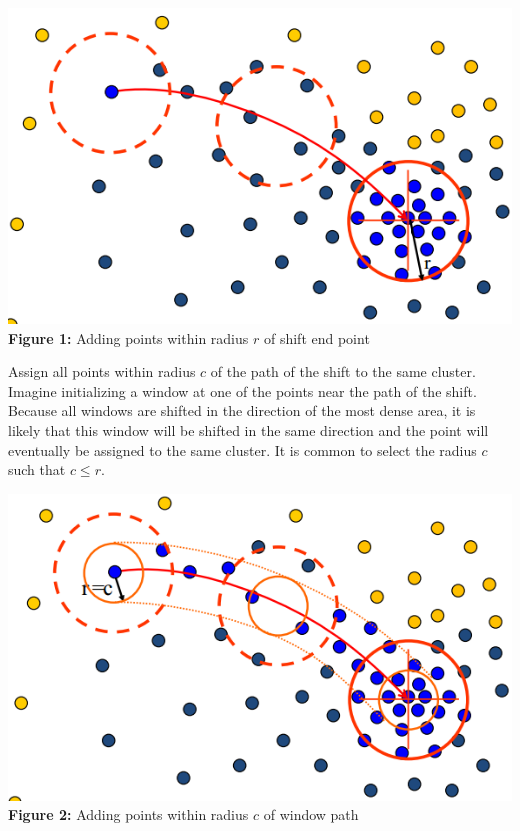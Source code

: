 \documentclass{article}
\begin{document}
\begin{center}
	\includegraphics[scale=0.5]{basin1.png}\\
    \textbf{Figure 1:} Adding points within radius $r$ of shift end point\\
\end{center}

Assign all points within radius $c$ of the path of the shift to the same cluster. Imagine initializing a window at one of the points near the path of the shift. Because all windows are shifted in the direction of the most dense area, it is likely that this window will be shifted in the same direction and the point will eventually be assigned to the same cluster. It is common to select the radius $c$ such that $c\le r$.

\begin{center}
	\includegraphics[scale=0.5]{basin2.png}\\
    \textbf{Figure 2:} Adding points within radius $c$ of window path\\
\end{center}
\end{document}
